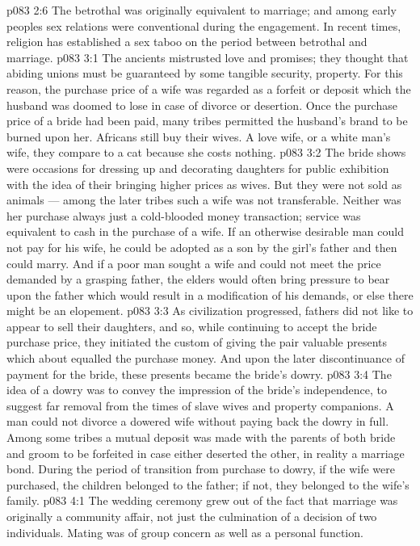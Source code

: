 \vs p083 2:6 The betrothal was originally equivalent to marriage; and among early peoples sex relations were conventional during the engagement. In recent times, religion has established a sex taboo on the period between betrothal and marriage.
\vs p083 3:1 The ancients mistrusted love and promises; they thought that abiding unions must be guaranteed by some tangible security, property. For this reason, the purchase price of a wife was regarded as a forfeit or deposit which the husband was doomed to lose in case of divorce or desertion. Once the purchase price of a bride had been paid, many tribes permitted the husband’s brand to be burned upon her. Africans still buy their wives. A love wife, or a white man’s wife, they compare to a cat because she costs nothing.
\vs p083 3:2 The bride shows were occasions for dressing up and decorating daughters for public exhibition with the idea of their bringing higher prices as wives. But they were not sold as animals --- among the later tribes such a wife was not transferable. Neither was her purchase always just a cold\hyp{}blooded money transaction; service was equivalent to cash in the purchase of a wife. If an otherwise desirable man could not pay for his wife, he could be adopted as a son by the girl’s father and then could marry. And if a poor man sought a wife and could not meet the price demanded by a grasping father, the elders would often bring pressure to bear upon the father which would result in a modification of his demands, or else there might be an elopement.
\vs p083 3:3 As civilization progressed, fathers did not like to appear to sell their daughters, and so, while continuing to accept the bride purchase price, they initiated the custom of giving the pair valuable presents which about equalled the purchase money. And upon the later discontinuance of payment for the bride, these presents became the bride’s dowry.
\vs p083 3:4 The idea of a dowry was to convey the impression of the bride’s independence, to suggest far removal from the times of slave wives and property companions. A man could not divorce a dowered wife without paying back the dowry in full. Among some tribes a mutual deposit was made with the parents of both bride and groom to be forfeited in case either deserted the other, in reality a marriage bond. During the period of transition from purchase to dowry, if the wife were purchased, the children belonged to the father; if not, they belonged to the wife’s family.
\vs p083 4:1 The wedding ceremony grew out of the fact that marriage was originally a community affair, not just the culmination of a decision of two individuals. Mating was of group concern as well as a personal function.
